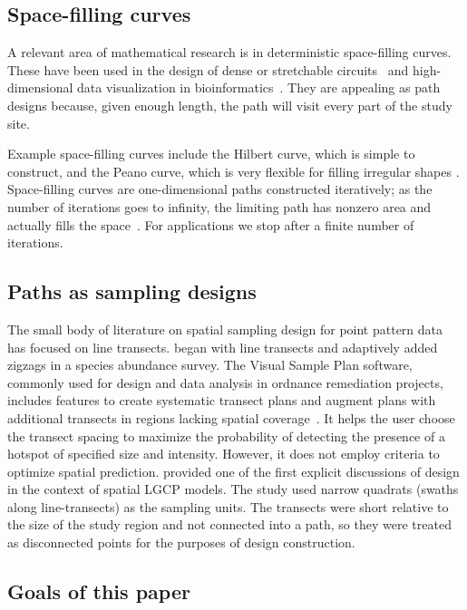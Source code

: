 \documentclass[review]{elsarticle}
\begin{document}
\subsection{Space-filling curves}

A relevant area of mathematical research is in deterministic space-filling
curves. These have been used in the design of dense or stretchable
circuits~\citep{ogorzalek,mazhang} and high-dimensional data visualization
in bioinformatics~\citep{hilbertvis}. They are appealing as path designs
because, given enough length, the path will visit every part of the study site.

Example space-filling curves include the Hilbert curve, which is simple to
construct, and the Peano curve, which is very flexible for filling irregular
shapes \citep{fanetal}. Space-filling curves are one-dimensional paths
constructed iteratively; as the number of iterations goes to infinity, the
limiting path has nonzero area and actually fills the space~\citep{sagan}. For
applications we stop after a finite number of iterations.


\subsection{Paths as sampling designs}

The small body of literature on spatial sampling design for point pattern
data has focused on line transects. \citet{pollard} began with line transects
and adaptively added zigzags in a species abundance survey. The Visual Sample
Plan software, commonly used for design and data analysis in ordnance
remediation projects, includes features to create systematic transect plans
and augment plans with additional transects in regions lacking spatial
coverage~\citep{vspguide}. It helps the user choose the transect spacing to
maximize the probability of detecting the presence of a hotspot of specified
size and intensity. However, it does not employ criteria to optimize spatial
prediction. \citet{liuvanhatalo} provided one of the first explicit discussions
of design in the context of spatial LGCP models. The study used narrow quadrats
(swaths along line-transects) as the sampling units. The transects were short
relative to the size of the study region and not connected into a path, so they
were treated as disconnected points for the purposes of design construction.


\subsection{Goals of this paper}
\end{document}
